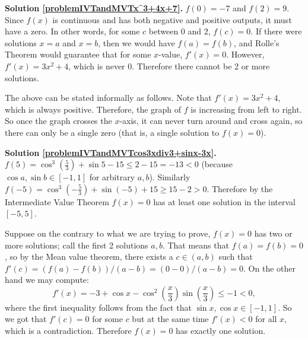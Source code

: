 \textbf{Solution \ref{problemIVTandMVTx^3+4x+7}.}  $f(0) = -7$ and $f(2) = 9$. Since $f(x)$ is continuous and has both negative and positive outputs, it must have a zero. In other words, for some $c$ between $0$ and $2$, $f(c) = 0$. If there were solutions $x = a$ and $x = b$,  then we would have $f(a) = f(b)$, and Rolle's Theorem would guarantee that for some $x$-value, $f'(x) = 0$. However, $f'(x) = 3x^2 + 4$, which is never 0. Therefore there cannot be 2 or more solutions. 

The above can be stated informally as follows. Note that $f'(x) = 3x^2 + 4$, which is always positive. Therefore, the graph of $f$ is increasing from left to right. So once the graph crosses the $x$-axis, it can never turn around and cross again, so there can only be a single zero (that is, a single solution to $f(x) = 0$).


\textbf{Solution \ref{problemIVTandMVTcos3xdiv3+sinx-3x}.} $f(5)= \cos^3 \left(\frac{5}{3}\right) +\sin 5-15 \leq 2-15=-13<0 $ (because $\cos a, \sin b\in [-1,1]$ for arbitrary $a,b$). Similarly $f(-5)=\cos^3\left(-\frac{5}{3}\right) +\sin (-5)+15 \geq 15-2>0$. Therefore by the Intermediate Value Theorem $f(x)=0$ has at least one solution in the interval $[-5,5]$.

Suppose on the contrary to what we are trying to prove, $f(x)=0$ has two or more solutions; call the first 2 solutions $a,b$. That means that $f(a)=f(b)=0$, so by the Mean value theorem, there exists a $c\in (a,b)$ such that $f'(c)=(f(a)-f(b))/(a-b)=(0-0)/(a-b)=0$. On the other hand we may compute:
\[ 
f'(x)=-3+\cos x-\cos^{2}\left(\frac{x}3\right)\sin\left(\frac{x}{3}\right) \leq -1<0,
\] 
where the first inequality follows from the fact that $\sin x,\cos x\in [-1,1]$. So we got that $f'(c)=0$ for some $c$ but at the same time $f'(x)<0$ for all $x$, which is a contradiction. Therefore $f(x)=0$ has exactly one solution. 